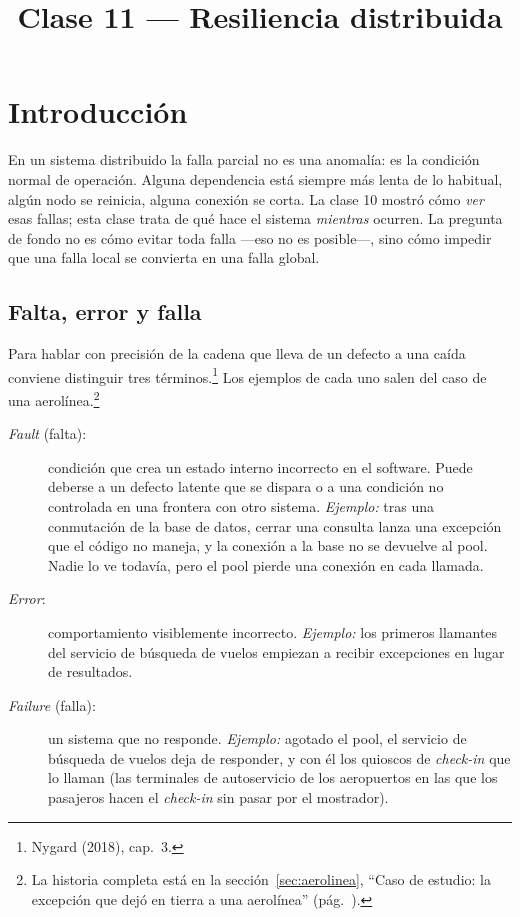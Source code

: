 \documentclass[variant=apuntes,cover=institutional,mode=screen]{ua-engineering-v6-article}
\title{Clase 11 --- Resiliencia distribuida}
\author{\UAProfessor}
\date{\UADate}
\begin{document}
\sloppy
\newcommand{\historiaaerolinea}{La historia completa está en la sección~\ref{sec:aerolinea}, ``Caso de estudio: la excepción que dejó en tierra a una aerolínea'' (pág.~\pageref{sec:aerolinea}).}
\maketitle

\section{Introducción}

En un sistema distribuido la falla parcial no es una anomalía: es la condición normal de operación. Alguna dependencia está siempre más lenta de lo habitual, algún nodo se reinicia, alguna conexión se corta. La clase 10 mostró cómo \emph{ver} esas fallas; esta clase trata de qué hace el sistema \emph{mientras} ocurren. La pregunta de fondo no es cómo evitar toda falla ---eso no es posible---, sino cómo impedir que una falla local se convierta en una falla global.

\subsection{Falta, error y falla}

Para hablar con precisión de la cadena que lleva de un defecto a una caída conviene distinguir tres términos.\footnote{Nygard (2018), cap.~3.} Los ejemplos de cada uno salen del caso de una aerolínea.\footnote{\historiaaerolinea}
\begin{description}
\item[\emph{Fault} (falta):] condición que crea un estado interno incorrecto en el software. Puede deberse a un defecto latente que se dispara o a una condición no controlada en una frontera con otro sistema. \emph{Ejemplo:} tras una conmutación de la base de datos, cerrar una consulta lanza una excepción que el código no maneja, y la conexión a la base no se devuelve al pool. Nadie lo ve todavía, pero el pool pierde una conexión en cada llamada.
\item[\emph{Error}:] comportamiento visiblemente incorrecto. \emph{Ejemplo:} los primeros llamantes del servicio de búsqueda de vuelos empiezan a recibir excepciones en lugar de resultados.
\item[\emph{Failure} (falla):] un sistema que no responde. \emph{Ejemplo:} agotado el pool, el servicio de búsqueda de vuelos deja de responder, y con él los quioscos de \emph{check-in} que lo llaman (las terminales de autoservicio de los aeropuertos en las que los pasajeros hacen el \emph{check-in} sin pasar por el mostrador).
\end{description}
\end{document}
